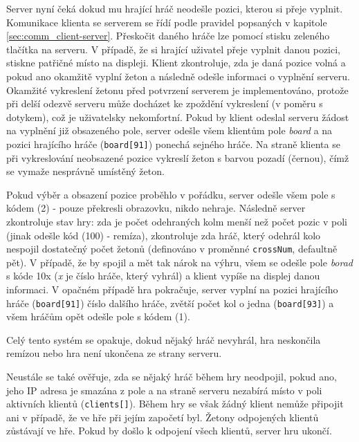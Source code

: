 Server nyní čeká dokud mu hrající hráč neodešle pozici, kterou si přeje vyplnit. Komunikace klienta se serverem se řídí podle pravidel popsaných v kapitole \ref{sec:comm_client-server}. Přeskočit daného hráče lze pomocí stisku zeleného tlačítka na serveru. V případě, že si hrající uživatel přeje vyplnit danou pozici, stiskne patřičné místo na displeji. Klient zkontroluje, zda je daná pozice volná a pokud ano okamžitě vyplní žeton a následně odešle informaci o vyplnění serveru. Okamžité vykreslení žetonu před potvrzení serverem je implementováno, protože při delší odezvě serveru může docházet ke zpoždění vykreslení (v poměru s dotykem), což je uživatelsky nekomfortní. Pokud by klient odeslal serveru žádost na vyplnění již obsazeného pole, server odešle všem klientům pole \textit{board} a na pozici hrajícího hráče (\texttt{board[91]}) ponechá sejného hráče. Na straně klienta se při vykreslování neobsazené pozice vykreslí žeton s barvou pozadí (černou), čímž se vymaže nesprávně umístěný žeton.

Pokud výběr a obsazení pozice proběhlo v pořádku, server odešle všem pole s kódem (2) - pouze překresli obrazovku, nikdo nehraje. Následně server zkontroluje stav hry: zda je počet odehraných kolm menší než počet pozic v poli (jinak odešle kód (100) - remíza), zkontroluje zda hráč, který odehrál kolo nespojil dostatečný počet žetonů (definováno v proměnné \texttt{crossNum}, defaultně pět). V případě, že by spojil a mět tak nárok na výhru, všem se odešle pole \textit{borad} s kóde 10x (\textit{x} je číslo hráče, který vyhrál) a klient vypíše na displej danou informaci. V opačném případě hra pokračuje, server vyplní na pozici hrajícího hráče (\texttt{board[91]}) číslo dalšího hráče, zvětší počet kol o jedna (\texttt{board[93]}) a všem hráčům opět odešle pole s kódem (1).

Celý tento systém se opakuje, dokud nějaký hráč nevyhrál, hra neskončila remízou nebo hra není ukončena ze strany serveru.

Neustále se také ověřuje, zda se nějaký hráč během hry neodpojil, pokud ano, jeho IP adresa je smazána z pole a na straně serveru nezabírá místo v poli aktivních klientů (\texttt{clients[]}). Během hry se však žádný klient nemůže připojit ani v případě, že ve hře při jejím započetí byl. Žetony odpojených klientů zůstávají ve hře. Pokud by došlo k odpojení všech klientů, server hru ukončí.

